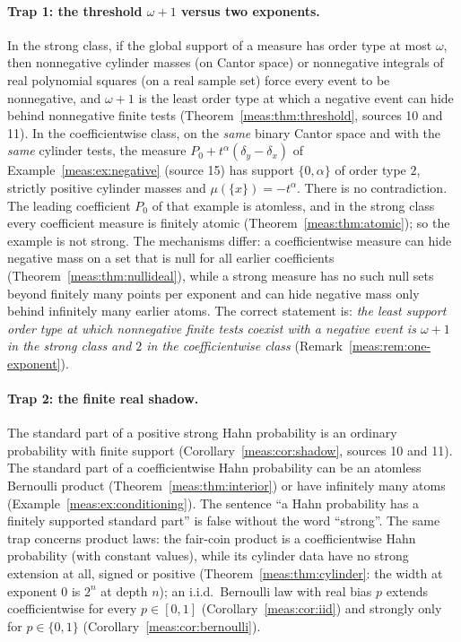 \documentclass[11pt]{article}
\numberwithin{equation}{section}
\theoremstyle{definition}
\theoremstyle{remark}
\begin{document}
\paragraph{Trap 1: the threshold $\omega+1$ versus two exponents.} In the
strong class, if the global support of a measure has order type at most
$\omega$, then nonnegative cylinder masses (on Cantor space) or nonnegative
integrals of real polynomial squares (on a real sample set) force every event
to be nonnegative, and $\omega+1$ is the least order type at which a negative
event can hide behind nonnegative finite tests
(Theorem~\ref{meas:thm:threshold}, sources 10 and 11). In the coefficientwise
class, on the \emph{same} binary Cantor space and with the \emph{same}
cylinder tests, the measure $P_0+t^\alpha(\delta_y-\delta_x)$ of
Example~\ref{meas:ex:negative} (source 15) has support $\{0,\alpha\}$ of order
type $2$, strictly positive cylinder masses and $\mu(\{x\})=-t^\alpha$. There is
no contradiction. The leading coefficient $P_0$ of that example is atomless,
and in the strong class every coefficient measure is finitely atomic
(Theorem~\ref{meas:thm:atomic}); so the example is not strong. The mechanisms
differ: a coefficientwise measure can hide negative mass on a set that is null
for all earlier coefficients (Theorem~\ref{meas:thm:nullideal}), while a strong
measure has no such null sets beyond finitely many points per exponent and
can hide negative mass only behind infinitely many earlier atoms. The correct
statement is: \emph{the least support order type at which nonnegative finite
tests coexist with a negative event is $\omega+1$ in the strong class and $2$
in the coefficientwise class} (Remark~\ref{meas:rem:one-exponent}).

\paragraph{Trap 2: the finite real shadow.} The standard part of a positive
strong Hahn probability is an ordinary probability with finite support
(Corollary~\ref{meas:cor:shadow}, sources 10 and 11). The standard part of a
coefficientwise Hahn probability can be an atomless Bernoulli product
(Theorem~\ref{meas:thm:interior}) or have infinitely many atoms
(Example~\ref{meas:ex:conditioning}). The sentence ``a Hahn probability has a
finitely supported standard part'' is false without the word ``strong''. The
same trap concerns product laws: the fair-coin product is a coefficientwise
Hahn probability (with constant values), while its cylinder data have no
strong extension at all, signed or positive (Theorem~\ref{meas:thm:cylinder}:
the width at exponent $0$ is $2^n$ at depth $n$); an i.i.d.\ Bernoulli law with real bias
$p$ extends coefficientwise for every $p\in[0,1]$
(Corollary~\ref{meas:cor:iid}) and strongly only for $p\in\{0,1\}$
(Corollary~\ref{meas:cor:bernoulli}).
\end{document}
